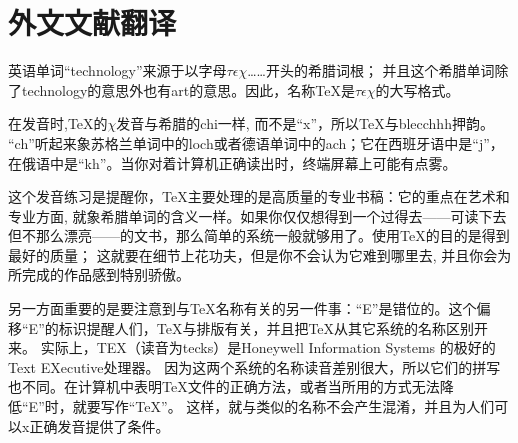 \chapter{外文文献翻译}

英语单词“technology”来源于以字母$\tau\epsilon\chi$……开头的希腊词根；
并且这个希腊单词除了technology的意思外也有art的意思。因此，名称\TeX{}是$\tau\epsilon\chi$的大写格式。

在发音时,\TeX{}的$\chi$发音与希腊的chi一样, 而不是“x”，所以\TeX{}与blecchhh押韵。
“ch”听起来象苏格兰单词中的loch或者德语单词中的ach；它在西班牙语中是“j”，在俄语中是“kh”。当你对着计算机正确读出时，终端屏幕上可能有点雾。

这个发音练习是提醒你，\TeX{}主要处理的是高质量的专业书稿：它的重点在艺术和专业方面, 就象希腊单词的含义一样。如果你仅仅想得到一个过得去——可读下去但不那么漂亮——的文书，那么简单的系统一般就够用了。使用\TeX{}的目的是得到最好的质量；
这就要在细节上花功夫，但是你不会认为它难到哪里去, 并且你会为所完成的作品感到特别骄傲。

另一方面重要的是要注意到与\TeX{}名称有关的另一件事：“E”是错位的。这个偏移“E”的标识提醒人们，\TeX{}与排版有关，并且把\TeX{}从其它系统的名称区别开来。
实际上，TEX（读音为tecks）是Honeywell Information Systems 的极好的Text EXecutive处理器。
因为这两个系统的名称读音差别很大，所以它们的拼写也不同。在计算机中表明\TeX{}文件的正确方法，或者当所用的方式无法降低“E”时，就要写作“TeX”。
这样，就与类似的名称不会产生混淆，并且为人们可以x正确发音提供了条件。
